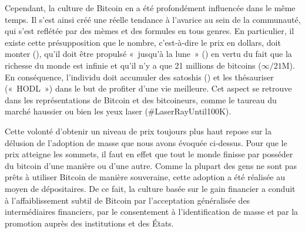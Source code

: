 Cependant, la culture de Bitcoin en a été profondément influencée dans le même temps. Il s'est ainsi créé une réelle tendance à l'avarice au sein de la communauté, qui s'est reflétée par des mèmes et des formules en tous genres. En particulier, il existe cette présupposition que le nombre, c'est-à-dire le prix en dollars, doit monter (), qu'il doit être propulsé «~jusqu'à la lune~» () en vertu du fait que la richesse du monde est infinie et qu'il n'y a que 21 millions de bitcoins ($\infty / 21\mathrm{M}$). En conséquence, l'individu doit accumuler des satoshis () et les thésauriser («~HODL~») dans le but de profiter d'une vie meilleure. Cet aspect se retrouve dans les représentations de Bitcoin et des bitcoineurs, comme le taureau du marché haussier ou bien les yeux laser (\#LaserRayUntil100K). %

Cette volonté d'obtenir un niveau de prix toujours plus haut repose sur la délusion de l'adoption de masse que nous avons évoquée ci-dessus. Pour que le prix atteigne les sommets, il faut en effet que tout le monde finisse par posséder du bitcoin d'une manière ou d'une autre. Comme la plupart des gens ne sont pas prêts à utiliser Bitcoin de manière souveraine, cette adoption a été réalisée au moyen de dépositaires. De ce fait, la culture basée sur le gain financier a conduit à l'affaiblissement subtil de Bitcoin par l'acceptation généralisée des intermédiaires financiers, par le consentement à l'identification de masse et par la promotion auprès des institutions et des États. %


